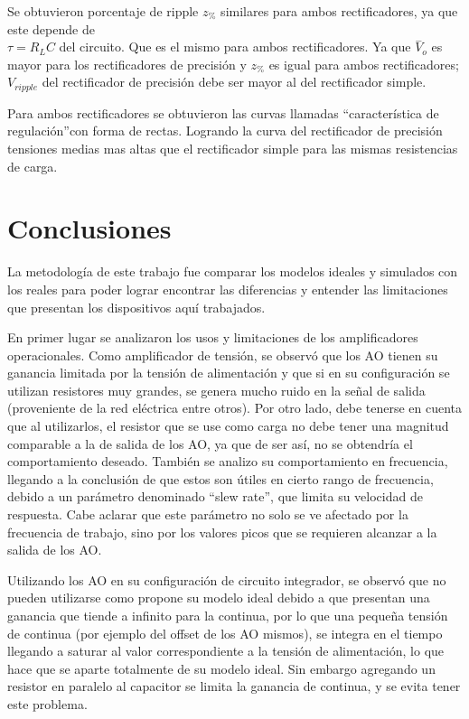 \documentclass[10pt,spanish,a4paper,openany,notitlepage]{article}
\begin{document}
Se obtuvieron porcentaje de ripple $z_{\%}$ similares para ambos rectificadores, ya que este depende de \\ $\tau = R_L C$ del circuito. Que es el mismo para ambos rectificadores. Ya que $\overset{-}{V}_{o}$ es mayor para los rectificadores de precisión y $z_{\%}$ es igual para ambos rectificadores; $V_{ripple}$
del rectificador de precisión debe ser mayor al del rectificador simple.

Para ambos rectificadores se obtuvieron las curvas llamadas \textquotedblleft característica de regulación\textquotedblright con forma de rectas. Logrando la curva del rectificador de precisión tensiones medias mas altas que el rectificador simple para las mismas resistencias de carga.

\section{Conclusiones}

La metodología de este trabajo fue comparar los modelos ideales y simulados con los reales para poder lograr encontrar las diferencias
y entender las limitaciones que presentan los dispositivos aquí trabajados.

En primer lugar se analizaron los usos y limitaciones de los amplificadores operacionales. Como amplificador de tensión, se observó
que los AO tienen su ganancia limitada por la tensión de alimentación y que si en su configuración se utilizan resistores muy grandes,
se genera mucho ruido en la señal de salida (proveniente de la red eléctrica entre otros). Por otro lado, debe tenerse en cuenta que 
al utilizarlos, el resistor que se use como carga no debe tener una magnitud comparable a la de salida de los AO, ya que de ser así, no se obtendría el comportamiento deseado. También se analizo su comportamiento en frecuencia, llegando a la conclusión de que estos
son útiles en cierto rango de frecuencia, debido a un parámetro denominado \textquotedblleft slew rate\textquotedblright, que limita su velocidad de respuesta. Cabe aclarar que este
parámetro no solo se ve afectado por la frecuencia de trabajo, sino por los valores picos que se requieren alcanzar a la salida de los AO.

Utilizando los AO en su configuración de circuito integrador, se observó que no pueden utilizarse como propone su modelo ideal debido
a que presentan una ganancia que tiende a infinito para la continua, por lo que una pequeña tensión de continua (por ejemplo del offset
de los AO mismos), se integra en el tiempo llegando a saturar al valor correspondiente a la tensión de 
alimentación, lo que hace que se aparte totalmente de su modelo ideal. Sin embargo agregando un resistor en paralelo al capacitor
se limita la ganancia de continua, y se evita tener este problema.
\end{document}

